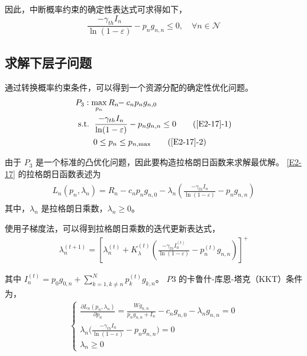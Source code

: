 因此，中断概率约束的确定性表达式可求得如下，
\begin{equation}\label{E2-16}
\frac{-\gamma_{th} I_{n}}{\ln(1-\varepsilon)}-p_n g_{n,n}\leq0,\quad\forall n\in\mathcal{N}
\end{equation}
\subsection{求解下层子问题}\label{section2-3-2}
通过转换概率约束条件，可以得到一个资源分配的确定性优化问题。
\begin{align}
&P_3: \max \limits_{p_{n}} R_{n}\!\!-c_{n} p_n g_{n,0}               \label{E2-17}\\
&\text { s.t. }
 \quad \!\!\!\!\! \frac{-\gamma_{th} I_{n}}{\ln(1-\varepsilon)}-p_n g_{n,n}\leq0 \tag{\ref{E2-17}{-1}} \label{E2-17-1}\\ %
& \quad \quad \quad \!\!\!\!\! 0\leq p_n\leq p_{n,\textrm{max}}                  \tag{\ref{E2-17}{-2}} \label{E2-17-2}  %
\end{align}

由于 $P_3$ 是一个标准的凸优化问题，因此要构造拉格朗日函数来求解最优解。 \eqref{E2-17} 的拉格朗日函数表述为
\begin{eqnarray}\label{E2-18}
\begin{array}{lll}
\textit{L}_n(p_n, \lambda_n)=R_{n}\!\!-\!\!c_{n} p_n g_{n,0}\!\!-\!\!\lambda_n \left(\frac{-\gamma_{th} I_{n}}{\ln(1-\varepsilon)}-p_n g_{n,n}\right)
\end{array}
\end{eqnarray}
其中，$\lambda_n$ 是拉格朗日乘数，$\lambda_n \geq 0$。

使用子梯度法，可以得到拉格朗日乘数的迭代更新表达式，
\begin{equation}\label{E2-19}
\begin{array}{lll}
     \lambda_n^{(t+1)}=[\lambda_n^{(t)}\!\!+\!K_{\lambda}^{(t)}(\frac{-\gamma_{th} I_{n}^{(t)}}{\ln(1-\varepsilon)}-p_n^{(t)} g_{n,n})]^+
\end{array}
\end{equation}

其中 $I_{n}^{(t)}=$$p_0 g_{0,n}+\sum_{k=1,k\neq n}^N p_k^{(t)} g_{k,n}$。
$P3$ 的卡鲁什-库恩-塔克（KKT）条件为，
\begin{equation}\label{E2-20}
\begin{array}{rl}
\left\{
\begin{array}{lll}
     \frac{\partial \textit{L}_n(p_n, \lambda_n)}{\partial p_n}\!=\!\frac{W g_{n,n}}{p_n g_{n,n}+I_n}\!-\!c_n g_{n,0}\!-\!\lambda_n g_{n,n}\!=\!0\\
     \lambda_n \big(\frac{-\gamma_{th} I_{n}}{\ln(1-\varepsilon)}-p_n g_{n,n}\big)=0\\
     \lambda_n \geq 0
\end{array}
\right.
\end{array}
\end{equation}

